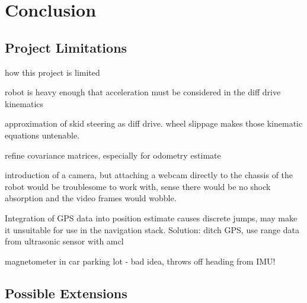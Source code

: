 \chapter{Conclusion}

\section{Project Limitations}
how this project is limited

robot is heavy enough that acceleration must be considered in the diff drive kinematics

approximation of skid steering as diff drive. wheel slippage makes those kinematic equations untenable.

refine covariance matrices, especially for odometry estimate

introduction of a camera, but attaching a webcam directly to the chassis of the robot would be troublesome to work with, sense there would be no shock absorption and the video frames would wobble.

Integration of GPS data into position estimate causes discrete jumps, may make it unsuitable for use in the navigation stack. Solution: ditch GPS, use range data from ultrasonic sensor with amcl

magnetometer in car parking lot - bad idea, throws off heading from IMU!

\section{Possible Extensions}

